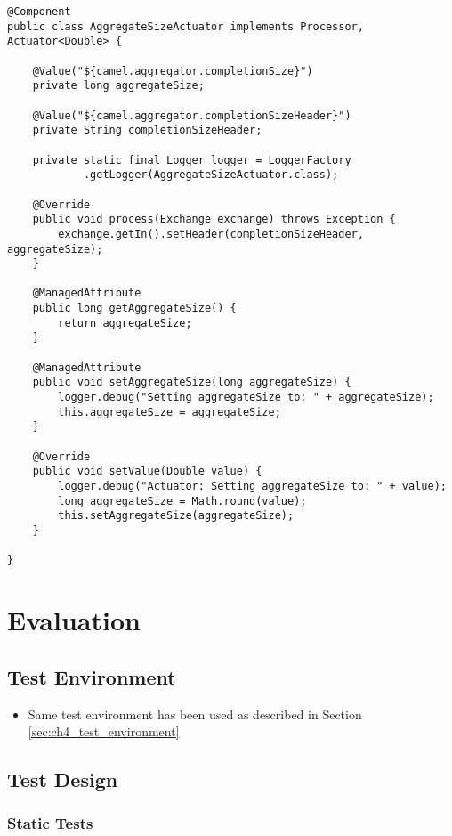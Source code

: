 \begin{lstlisting}[caption={AggregateSizeActuator},label=listing:ch5_aggregateSizeActuator]
@Component
public class AggregateSizeActuator implements Processor, Actuator<Double> {

	@Value("${camel.aggregator.completionSize}")
	private long aggregateSize;
	
	@Value("${camel.aggregator.completionSizeHeader}")
	private String completionSizeHeader;
	
	private static final Logger logger = LoggerFactory
			.getLogger(AggregateSizeActuator.class);
	
	@Override
	public void process(Exchange exchange) throws Exception {
		exchange.getIn().setHeader(completionSizeHeader, aggregateSize);
	}

	@ManagedAttribute
	public long getAggregateSize() {
		return aggregateSize;
	}

	@ManagedAttribute
	public void setAggregateSize(long aggregateSize) {
		logger.debug("Setting aggregateSize to: " + aggregateSize);
		this.aggregateSize = aggregateSize;
	}

	@Override
	public void setValue(Double value) {
		logger.debug("Actuator: Setting aggregateSize to: " + value);
		long aggregateSize = Math.round(value);
		this.setAggregateSize(aggregateSize);
	}

}

\end{lstlisting}

\section{Evaluation}

\subsection{Test Environment}

\begin{itemize}
	\item Same test environment has been used as described in Section \ref{sec:ch4_test_environment}
\end{itemize}

\subsection{Test Design}

\subsubsection{Static Tests}
\label{sec:ch05_static_tests}

